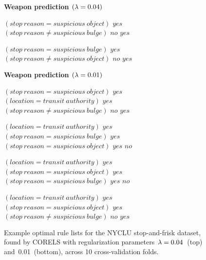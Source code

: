 \begin{figure}[b!]
\textbf{Weapon prediction $({\lambda} = 0.04)$}
\vspace{1mm}
\begin{algorithmic}
\State \bif $(stop~reason = suspicious~object)$ \bthen $yes$ 
\State \belif $(stop~reason \neq suspicious~bulge)$ \bthen $no$
\State \belse $yes$
\end{algorithmic}
\vspace{1mm}
\begin{algorithmic}
\State \bif $(stop~reason = suspicious~bulge)$ \bthen $yes$ 
\State \belif $(stop~reason \neq suspicious~object)$ \bthen $no$
\State \belse $yes$
\end{algorithmic}
\vspace{5mm}
\textbf{Weapon prediction $({\lambda} = 0.01)$}
\vspace{1mm}
\begin{algorithmic}
\State \bif $(stop~reason = suspicious~object)$ \bthen $yes$ 
\State \belif $(location = transit~authority)$ \bthen $yes$
\State \belif $(stop~reason \neq suspicious~bulge)$ \bthen $no$
\State \belse $yes$
\end{algorithmic}
\vspace{1mm}
\begin{algorithmic}
\State \bif $(location = transit~authority)$ \bthen $yes$ 
\State \belif $(stop~reason = suspicious~bulge)$ \bthen $yes$
\State \belif $(stop~reason = suspicious~object)$ \bthen $yes$
\State \belse $no$
\end{algorithmic}
\vspace{1mm}
\begin{algorithmic}
\State \bif $(location = transit~authority)$ \bthen $yes$ 
\State \belif $(stop~reason = suspicious~object)$ \bthen $yes$
\State \belif $(stop~reason = suspicious~bulge)$ \bthen $yes$
\State \belse $no$
\end{algorithmic}
\vspace{1mm}
\begin{algorithmic}
\State \bif $(location = transit~authority)$ \bthen $yes$ 
\State \belif $(stop~reason = suspicious~object)$ \bthen $yes$
\State \belif $(stop~reason \neq suspicious~bulge)$ \bthen $no$
\State \belse $yes$
\end{algorithmic}
\caption{Example optimal rule lists for the NYCLU stop-and-frisk dataset,
found by CORELS with regularization parameters~${{\lambda} = 0.04}$~(top) and~0.01~(bottom),
across 10 cross-validation folds.
}
\label{fig:weapon-rule-list-04-01}
\end{figure}


